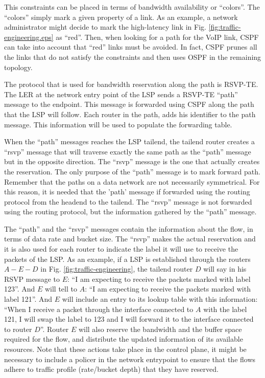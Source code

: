 This constraints can be placed in terms of bandwidth availability or ``colors''.
The ``colors'' simply mark a given property of a link.
As an example, a network administrator might decide to mark the high-latency link in Fig. \ref{fig:traffic-engineering.eps} as ``red''.
Then, when looking for a path for the VoIP link, CSPF can take into account that ``red'' links must be avoided.
In fact, CSPF prunes all the links that do not satisfy the constraints and then uses OSPF in the remaining topology.

The protocol that is used for bandwidth reservation along the path is RSVP-TE.
The LER at the network entry point of the LSP sends a RSVP-TE ``path'' message to the endpoint.
This message is forwarded using CSPF along the path that the LSP will follow. 
Each router in the path, adds his identifier to the path message.
This information will be used to populate the forwarding table.

When the ``path'' messages reaches the LSP tailend, the tailend router creates a ``rsvp'' message that will traverse exactly the same path as the ``path'' message but in the opposite direction.
The ``rsvp'' message is the one that actually creates the reservation.
The only purpose of the ``path'' message is to mark forward path.
Remember that the paths on a data network are not necessarily symmetrical.
For this reason, it is needed that the 'path' message if forwarded using the routing protocol from the headend to the tailend.
The ``rsvp'' message is not forwarded using the routing protocol, but the information gathered by the ``path'' message.

The ``path'' and the ``rsvp'' messages contain the information about the flow, in terms of data rate and bucket size.
The ``rsvp'' makes the actual reservation and it is also used for each router to indicate the label it will use to receive the packets of the LSP.
As an example, if a LSP is established through the routers $A-E-D$ in Fig. \ref{fig:traffic-engineering}, the tailend router $D$ will say in his RSVP message to $E$:
``I am expecting to receive the packets marked with label 123''.
And $E$ will tell to $A$: ``I am expecting to receive the packets marked with label 121''.
And $E$ will include an entry to its lookup table with this information: ``When I receive a packet through the interface connected to $A$ with the label 121, I will swap the label to 123 and I will forward it to the interface connected to router $D$''.
Router $E$ will also reserve the bandwidth and the buffer space required for the flow, and distribute the updated information of its available resources.
Note that these actions take place in the control plane, it might be necessary to include a policer in the network entrypoint to ensure that the flows adhere to traffic profile (rate/bucket depth) that they have reserved.



